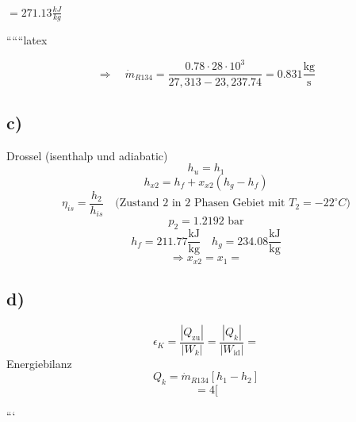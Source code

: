 $= 271.13 \frac{kJ}{kg}$

``````latex


\[
\Rightarrow \quad \dot{m}_{R134} = \frac{0.78 \cdot 28 \cdot 10^3}{27,313 - 23,237.74} = 0.831 \frac{\text{kg}}{\text{s}}
\]

\subsection*{c)}
Drossel (isenthalp und adiabatic) \\
\[
h_u = h_1
\]
\[
h_{x2} = h_f + x_{x2} (h_g - h_f)
\]
\[
\eta_{is} = \frac{h_2}{h_{is}} \quad \text{(Zustand 2 in 2 Phasen Gebiet mit } T_2 = -22^\circ C)
\]
\[
p_2 = 1.2192 \text{ bar}
\]
\[
h_f = 211.77 \frac{\text{kJ}}{\text{kg}} \quad h_g = 234.08 \frac{\text{kJ}}{\text{kg}}
\]
\[
\Rightarrow x_{x2} = x_1 =
\]

\subsection*{d)}
\[
\epsilon_K = \frac{|Q_{\text{zu}}|}{|W_k|} = \frac{|Q_k|}{|W_{\text{id}}|} =
\]
Energiebilanz
\[
Q_k = \dot{m}_{R134} [h_1 - h_2]
\]
\[
= 4 [
\]

```